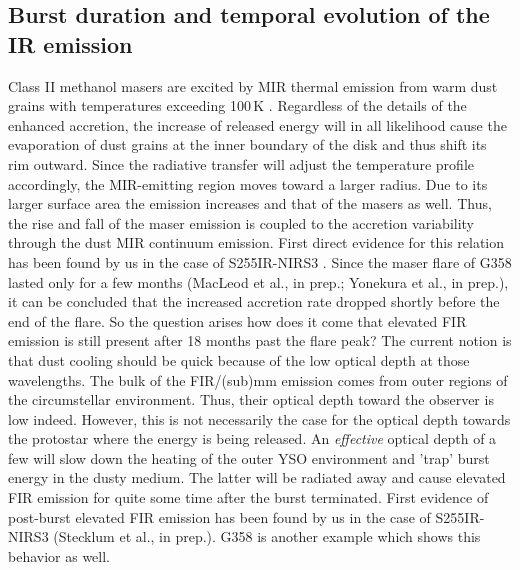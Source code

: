 
\subsection{Burst duration and temporal evolution of the IR emission}\label{bd}
Class II methanol masers are excited by MIR thermal emission from warm dust grains with temperatures exceeding 100\,K
\citep{2002IAUS..206..183O, 2005MNRAS.360..533C}. Regardless of the details of the enhanced accretion, the increase of released energy will in all likelihood cause the evaporation of dust grains at the inner boundary of the disk and thus shift its rim outward. Since the radiative transfer will adjust the temperature profile accordingly, the MIR-emitting region moves toward a larger radius.
Due to its larger surface area
the emission increases and that of the masers as well. Thus, the rise and fall of the maser emission is coupled to the accretion variability through the dust MIR continuum emission. First direct evidence for this relation has been found by us in the case of S255IR-NIRS3 \citep{hansfest}. Since the maser flare of G358 lasted only for a few months %
(MacLeod et al., in prep.; Yonekura et al., in prep.), it can be concluded that the increased accretion rate dropped shortly before the end of the flare. So the question arises how does it come that elevated FIR emission is still present after 18 months past the flare peak? The current notion is that dust cooling should be quick because of the low optical depth at those wavelengths. The bulk of the FIR/(sub)mm emission comes from outer regions of the circumstellar environment. Thus, their optical depth toward the observer is low indeed. However, this is not necessarily the case for the optical depth towards the protostar where the energy is being released. An {\em effective} optical depth of a few will slow down the heating of the outer YSO environment and 'trap' burst energy in the dusty medium. The latter will be radiated away and cause elevated FIR emission for quite some time after the burst terminated. First evidence of post-burst elevated FIR emission has been found by us in the case of S255IR-NIRS3 (Stecklum et al., in prep.). G358 is another example which shows this behavior as well. 


